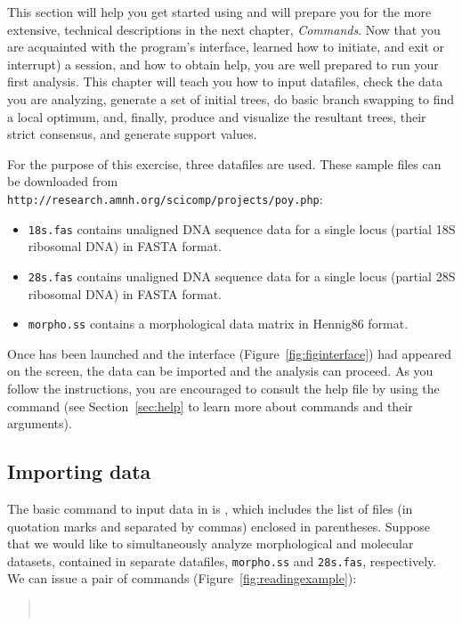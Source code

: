 This section will help you get started using \poy and will prepare you for the
more extensive, technical descriptions in the next chapter, \emph{\poy Commands}. Now that you are acquainted with the program's interface, learned how to initiate, and exit or interrupt) a \poy session, and how to obtain help, you are well prepared to run your first analysis. This chapter will teach
you how to input datafiles, check the data you are analyzing, generate
a set of initial trees, do basic branch swapping to find a local optimum, and, finally, produce
and visualize the resultant trees, their strict consensus, and generate support values.

For the purpose of this exercise, three datafiles are used. These sample files can be downloaded from \\
\texttt{http://research.amnh.org/scicomp/projects/poy.php}:

\begin{itemize}
	\item {\texttt{18s.fas} contains unaligned DNA sequence data for a single locus (partial 18S ribosomal DNA) in FASTA format.}
	\item {\texttt{28s.fas} contains unaligned DNA sequence data for a single locus (partial 28S ribosomal DNA) in FASTA format.}
	\item {\texttt{morpho.ss} contains a morphological data matrix in Hennig86 format.}
\end{itemize}

Once \poy has been launched and the interface (Figure~\ref{fig:figinterface}) had appeared on the screen, the data can be imported and the analysis can proceed. As you follow the instructions, you are encouraged to consult the help file by using the command  (see Section~\ref{sec:help} to learn more about \poy commands and their arguments).

\subsection{Importing data} \label{sec:import}

The basic command to input data in \poy is , which includes the list of files (in quotation marks and separated by commas) enclosed in parentheses. Suppose that we would like to simultaneously analyze morphological and molecular datasets, contained in separate datafiles, \texttt{morpho.ss} and \texttt{28s.fas}, respectively. We can issue a pair of  commands (Figure~\ref{fig:readingexample}):
\begin{quote}
        \\
\end{quote}

